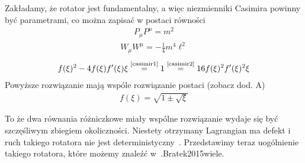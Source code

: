 Zakładamy, że rotator jest fundamentalny, a więc niezmienniki
Casimira powinny być parametrami, co można zapisać w postaci
równości
\begin{align} \label{casimir1}
P_\mu P^\mu = m^2 \tag{C1}
\end{align}
\begin{align} \label{casimir2}
W_\mu W^\mu = - \frac{1}{4} m^4 \ell^2\tag{C2}
\end{align}
\begin{align} 
 f(\xi)^2- 4 f(\xi) f'(\xi) \xi
\stackrel{\text{\ref{casimir1}}}{=} 
1 \stackrel{\text{\ref{casimir2}}}{=}
  16   f(\xi)^2 f'(\xi)^2 \xi
\end{align}
Powyższe rozwiązanie mają wspóle rozwiązanie 
postaci (zobacz dod. A)
\begin{align}
f(\xi ) = \sqrt{ 1 \pm \sqrt{\xi} }
\end{align}

To że dwa równania różniczkowe miały wspólne rozwiązanie 
wydaje się być szczęśliwym zbiegiem okoliczności. 
Niestety otrzymany Lagrangian ma defekt i ruch takiego 
rotatora nie jest deterministyczny~\cite{Bratek2012Spinorindeterm}.
Przedstawimy teraz uogólnienie takiego rotatora,
które możemy znaleźć w~\cite{Bratek2015wiele}.{Bratek2015wiele}.


